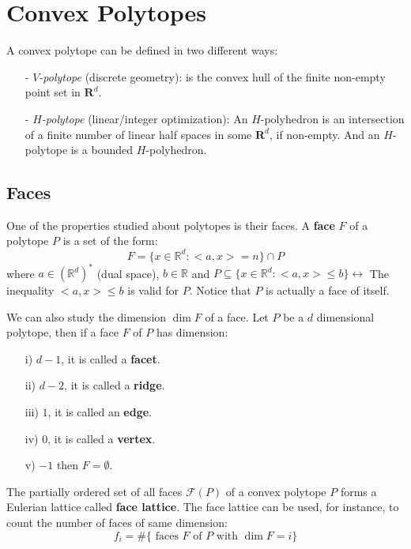 \chapter{Convex Polytopes}

 
A convex polytope can be defined in two different ways:
\begin{enumerate}
\item[-] \textit{$V$-polytope} (discrete geometry): is the convex hull of the finite non-empty point set in $\mathbf{R}^d$.
\item[-]\textit{$H$-polytope} (linear/integer optimization): An $H$-polyhedron is an intersection of a finite number of linear half spaces in some $\mathbf{R}^d$, if non-empty. And an $H$-polytope is a bounded $H$-polyhedron. 
\end{enumerate}
\bigskip
\section{Faces}
One of the properties studied about polytopes is their faces. A \textbf{face} $F$ of a polytope $P$ is a set of the form:
\[F = \{x\in \mathbb{R}^d: <a,x> = n\}\cap P\]
where $a\in (\mathbb{R}^d)^*$ (dual space), $b\in\mathbb{R}$ and $P\subseteq\{x\in\mathbb{R}^d: <a,x> \leq b \}\longleftrightarrow$ The inequality $<a,x> \leq b$ is valid for $P$. Notice that $P$ is actually a face of itself. 

We can also study the dimension $\dim F$ of a face. Let $P$ be a $d$ dimensional polytope, then if a face $F$ of $P$ has dimension:
\begin{itemize}
\item[i)] $d -1$, it is called a \textbf{facet}.
\item[ii)] $d -2$, it is called a \textbf{ridge}.
\item[iii)] $1$, it is called an \textbf{edge}.
\item[iv)] $0$, it is called a \textbf{vertex}.
\item[v)] $ -1$ then $F=\emptyset$.
\end{itemize}

The partially ordered set of all faces  $\mathcal{F}(P)$ of a convex polytope $P$ forms a Eulerian lattice called \textbf{face lattice}. The face lattice can be used, for instance, to count the number of faces of same dimension:
\[f_i = \# \{ \mbox{ faces } F \mbox{ of } P \mbox{ with } \dim F=i\} \label{eq1}\]

\bigskip

